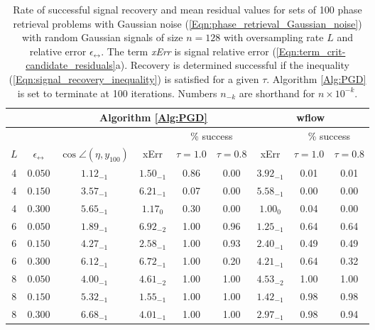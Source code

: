 \begin{enumerate}
\begin{table}[H]
\centering
\begin{tabular}{ |cc|c|c|cc|c|cc| }
\hline
	\multicolumn{2}{|c|}{}
	&	\multicolumn{4}{c|}{Algorithm \ref{Alg:PGD}} 	
		&	\multicolumn{3}{c|}{wflow} 	  \\
 \hline
 	&&&&	\multicolumn{2}{c|}{\% success}
 				&&	\multicolumn{2}{c|}{\% success}	\\
$L$	&	$\epsilon_\rel$ 	&	$\cos \angle (\eta, y_{100})$ &  xErr &	$\tau= 1.0$ & $\tau= 0.8$	 & xErr &	$\tau= 1.0$ & $\tau= 0.8$	 \\
\hline
  4 & $0.050$ & $1.12_{-1}$ & $1.50_{-1}$ &  0.86 & 0.00 & $3.92_{-1}$ & 0.01 & 0.01	\\
  4 & $0.150$ & $3.57_{-1}$ & $6.21_{-1}$ &  0.07 & 0.00 & $5.58_{-1}$ & 0.00 & 0.00	\\
   4 & $0.300$ & $5.65_{-1}$ & $1.17_{0}$ &  0.30 & 0.00 & $1.00_{0}$ & 0.04 & 0.00	\\
\hline
  6 & $0.050$ & $1.89_{-1}$ & $6.92_{-2}$ &  1.00 & 0.96 & $1.25_{-1}$ & 0.64 & 0.64	\\
  6 & $0.150$ & $4.27_{-1}$ & $2.58_{-1}$ &  1.00 & 0.93 & $2.40_{-1}$ & 0.49 & 0.49	\\
  6 & $0.300$ & $6.12_{-1}$ & $6.72_{-1}$ &  1.00 & 0.20 & $4.21_{-1}$ & 0.64 & 0.32	\\
\hline
  8 & $0.050$ & $4.00_{-1}$ & $4.61_{-2}$ &  1.00 & 1.00 & $4.53_{-2}$ & 1.00 & 1.00	\\
  8 & $0.150$ & $5.32_{-1}$ & $1.55_{-1}$ &  1.00 & 1.00 & $1.42_{-1}$ & 0.98 & 0.98	\\
  8 & $0.300$ & $6.68_{-1}$ & $4.01_{-1}$ &  1.00 & 1.00 & $2.97_{-1}$ & 0.98 & 0.94	\\
\hline

\end{tabular}
\caption{Rate of successful signal recovery and mean residual values for sets of 100 phase retrieval problems with Gaussian noise (\ref{Eqn:phase_retrieval_Gaussian_noise}) with random Gaussian signals of size $n = 128$ with oversampling rate $L$ and relative error $\epsilon_\rel$.  The term \textit{xErr} is signal relative error (\ref{Eqn:term_crit-candidate_residuals}a).  Recovery is determined successful if the inequality (\ref{Eqn:signal_recovery_inequality}) is satisfied for a given $\tau$.  Algorithm \ref{Alg:PGD} is set to terminate at 100 iterations. Numbers $n_{-k}$ are shorthand for $n \times 10^{-k}$.} \label{Tab:relative_errors_saga_vs_wflow}
\end{table}




\end{enumerate}
